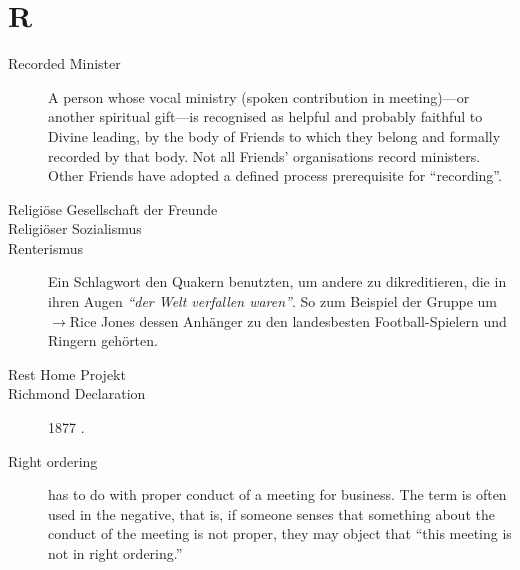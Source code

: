 \section*{R}

\articlesize

\begin{description}

 \item[Recorded Minister]
    A person whose vocal ministry (spoken contribution in meeting)—or another spiritual gift—is recognised as helpful and probably faithful to Divine leading, by the body of Friends to which they belong and formally recorded by that body. Not all Friends' organisations record ministers. Other Friends have adopted a defined process prerequisite for "`recording"'.
 

 \item[Religiöse Gesellschaft der Freunde]

  \item[Religiöser Sozialismus]

 \item[Renterismus] Ein Schlagwort den Quakern benutzten, um andere zu dikreditieren, die in ihren Augen \textit{"`der Welt verfallen waren"'}. So zum Beispiel der Gruppe um   $\to$Rice Jones dessen Anhänger zu den landesbesten Football-Spielern und Ringern gehörten.

 \item[Rest Home Projekt]

 \item[Richmond Declaration] 1877 .

 \item[Right ordering]
    has to do with proper conduct of a meeting for business. The term is often used in the negative, that is, if someone senses that something about the conduct of the meeting is not proper, they may object that "`this meeting is not in right ordering."'

 \end{description}

\normalsize
